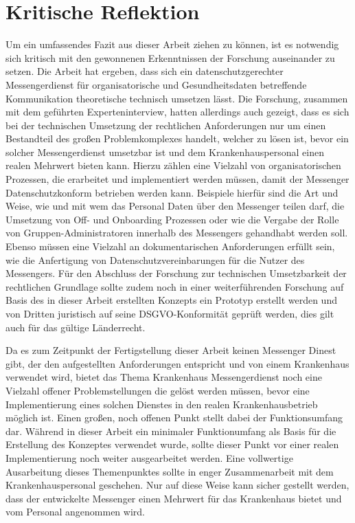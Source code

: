 \section{Kritische Reflektion}\label{chapter:kr}
Um ein umfassendes Fazit aus dieser Arbeit ziehen zu können, ist es notwendig sich kritisch mit den gewonnenen Erkenntnissen der Forschung auseinander zu setzen. Die Arbeit hat ergeben, dass sich ein datenschutzgerechter Messengerdienst für organisatorische und Gesundheitsdaten betreffende Kommunikation theoretische technisch umsetzen lässt. Die Forschung, zusammen mit dem geführten Experteninterview, hatten allerdings auch gezeigt, dass es sich bei der technischen Umsetzung der rechtlichen Anforderungen nur um einen Bestandteil des großen Problemkomplexes handelt, welcher zu lösen ist, bevor ein solcher Messengerdienst umsetzbar ist und dem Krankenhauspersonal einen realen Mehrwert bieten kann. Hierzu zählen eine Vielzahl von organisatorischen Prozessen, die erarbeitet und implementiert werden müssen, damit der Messenger Datenschutzkonform betrieben werden kann. Beispiele hierfür sind die Art und Weise, wie und mit wem das Personal Daten über den Messenger teilen darf, die Umsetzung von Off- und Onboarding Prozessen oder wie die Vergabe der Rolle von Gruppen-Administratoren innerhalb des Messengers gehandhabt werden soll. Ebenso müssen eine Vielzahl an dokumentarischen Anforderungen erfüllt sein, wie die Anfertigung von Datenschutzvereinbarungen für die Nutzer des Messengers.
Für den Abschluss der Forschung zur technischen Umsetzbarkeit der rechtlichen Grundlage sollte zudem noch in einer weiterführenden Forschung auf Basis des in dieser Arbeit erstellten Konzepts ein Prototyp erstellt werden und von Dritten juristisch auf seine DSGVO-Konformität geprüft werden, dies gilt auch für das gültige Länderrecht.

Da es zum Zeitpunkt der Fertigstellung dieser Arbeit keinen Messenger Dinest gibt, der den aufgestellten Anforderungen entspricht und von einem Krankenhaus verwendet wird, bietet das Thema Krankenhaus Messengerdienst noch eine Vielzahl offener Problemstellungen die gelöst werden müssen, bevor eine Implementierung eines solchen Dienstes in den realen Krankenhausbetrieb möglich ist.
Einen großen, noch offenen Punkt stellt dabei der Funktionsumfang dar. Während in dieser Arbeit ein minimaler Funktionumfang als Basis für die Erstellung des Konzeptes verwendet wurde, sollte dieser Punkt vor einer realen Implementierung noch weiter ausgearbeitet werden. Eine vollwertige Ausarbeitung dieses Themenpunktes sollte in enger Zusammenarbeit mit dem Krankenhauspersonal geschehen. Nur auf diese Weise kann sicher gestellt werden, dass der entwickelte Messenger einen Mehrwert für das Krankenhaus bietet und vom Personal angenommen wird.

